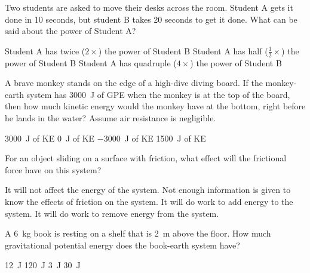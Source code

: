 \documentclass[]{exam}
\begin{document}
\begin{questions}
\question
Two students are asked to move their desks across the room. Student A gets it done in 10 seconds, but student B takes 20 seconds to get it done. What can be said about the power of Student A?

\begin{randomizechoices}
    \correctchoice Student A has twice ($2\times$) the power of Student B
    \choice Student A has half ($\frac{1}{2}\times$) the power of Student B
    \choice Student A has quadruple ($4\times$) the power of Student B
\end{randomizechoices}


\question
A brave monkey stands on the edge of a high-dive diving board. If the monkey-earth system has \SI{3000}{J} of GPE when the monkey is at the top of the board, then how much kinetic energy would the monkey have at the bottom, right before he lands in the water? Assume air resistance is negligible.

\begin{randomizechoices}
    \correctchoice \SI{3000}{J} of KE
    \choice \SI{0}{J} of KE
    \choice \SI{-3000}{J} of KE
    \choice \SI{1500}{J} of KE
\end{randomizechoices}





\question 
For an object sliding on a surface with friction, what effect will the frictional force have on this system?

\begin{randomizechoices}
    \choice It will not affect the energy of the system.
    \choice Not enough information is given to know the effects of friction on the system.
    \choice It will do work to add energy to the system.
    \correctchoice It will do work to remove energy from the system.
\end{randomizechoices}

\question
A \SI{6}{kg} book is resting on a shelf that is \SI{2}{m} above the floor. How much gravitational potential energy does the book-earth system have?

\begin{randomizechoices}
    \choice \SI{12}{J}
    \correctchoice \SI{120}{J}
    \choice \SI{3}{J}
    \choice \SI{30}{J}
\end{randomizechoices}


\end{questions}
\end{document}
